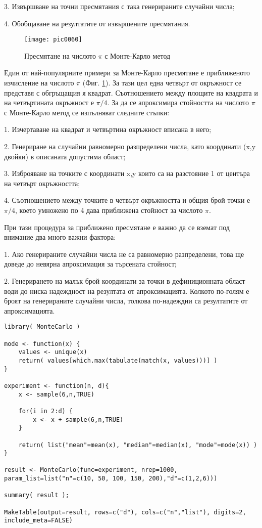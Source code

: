 3. Извършване на точни пресмятания с така генерираните случайни числа;

4. Обобщаване на резултатите от извършените пресмятания.

\begin{figure}[h!]
  \centering
  \texttt{[image: pic0060]}
  \caption{Пресмятане на числото $\pi$ с Монте-Карло метод}
\label{figure0060}
\end{figure}
\FloatBarrier

Един от най-популярните примери за Монте-Карло пресмятане е приближеното изчисление на числото $\pi$ (Фиг. \ref{figure0060}). За тази цел една четвърт от окръжност се представя с обгръщащия я квадрат. Съотношението между площите на квадрата и на четвъртината окръжност е $\pi/4$. За да се апроксимира стойността на числото $\pi$ с Монте-Карло метод се изпълняват следните стъпки:

1. Изчертаване на квадрат и четвъртина окръжност вписана в него;

2. Генериране на случайни равномерно разпределени числа, като координати (x,y двойки) в описаната допустима област;

3. Изброяване на точките с координати x,y които са на разстояние 1 от центъра на четвърт окръжността; 

4. Съотношението между точките в четвърт окръжността и общия брой точки е $\pi/4$, което умножено по 4 дава приближена стойност за числото $\pi$. 

При тази процедура за приближено пресмятане е важно да се вземат под внимание два много важни фактора:

1. Ако генерираните случайни числа не са равномерно разпределени, това ще доведе до невярна апроксимация за търсената стойност;

2. Генерирането на малък брой координати за точки в дефиниционната област води до ниска надеждност на резултата от апроксимацията. Колкото по-голям е броят на генерираните случайни числа, толкова по-надеждни са резултатите от апроксимацията.

\begin{lstlisting}[caption=Монте-Карло пресмятане, label=listing0175]
library( MonteCarlo )

mode <- function(x) {
	values <- unique(x)
	return( values[which.max(tabulate(match(x, values)))] )
}

experiment <- function(n, d){
	x <- sample(6,n,TRUE)

	for(i in 2:d) {
		x <- x + sample(6,n,TRUE)
	}

	return( list("mean"=mean(x), "median"=median(x), "mode"=mode(x)) )
}

result <- MonteCarlo(func=experiment, nrep=1000, param_list=list("n"=c(10, 50, 100, 150, 200),"d"=c(1,2,6)))

summary( result );

MakeTable(output=result, rows=c("d"), cols=c("n","list"), digits=2, include_meta=FALSE)
\end{lstlisting}

